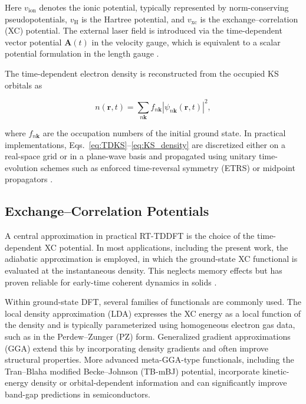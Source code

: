 Here $v_{\mathrm{ion}}$ denotes the ionic potential, typically represented by norm-conserving pseudopotentials, $v_{\mathrm{H}}$ is the Hartree potential, and $v_{\mathrm{xc}}$ is the exchange--correlation (XC) potential. The external laser field is introduced via the time-dependent vector potential $\mathbf A(t)$ in the velocity gauge, which is equivalent to a scalar potential formulation in the length gauge \cite{Yabana2012,PhysRevB.89.064304}.

The time-dependent electron density is reconstructed from the occupied KS orbitals as

\begin{equation}
  n(\mathbf r,t)
  = \sum_{n\mathbf{k}} f_{n\mathbf{k}}
    \left|\psi_{n\mathbf{k}}(\mathbf r,t)\right|^2,
  \label{eq:KS_density}
\end{equation}

where $f_{n\mathbf{k}}$ are the occupation numbers of the initial ground state. In practical implementations, Eqs.~\eqref{eq:TDKS}--\eqref{eq:KS_density} are discretized either on a real-space grid or in a plane-wave basis and propagated using unitary time-evolution schemes such as enforced time-reversal symmetry (ETRS) or midpoint propagators \cite{Yabana2012,PhysRevB.89.064304}.

\subsection{Exchange--Correlation Potentials}

A central approximation in practical RT-TDDFT is the choice of the time-dependent XC potential. In most applications, including the present work, the adiabatic approximation is employed, in which the ground-state XC functional is evaluated at the instantaneous density. This neglects memory effects but has proven reliable for early-time coherent dynamics in solids \cite{Botti2007,Sato2025review}.

Within ground-state DFT, several families of functionals are commonly used. The local density approximation (LDA) expresses the XC energy as a local function of the density and is typically parameterized using homogeneous electron gas data, such as in the Perdew--Zunger (PZ) form. Generalized gradient approximations (GGA) extend this by incorporating density gradients and often improve structural properties. More advanced meta-GGA-type functionals, including the Tran--Blaha modified Becke--Johnson (TB-mBJ) potential, incorporate kinetic-energy density or orbital-dependent information and can significantly improve band-gap predictions in semiconductors.

